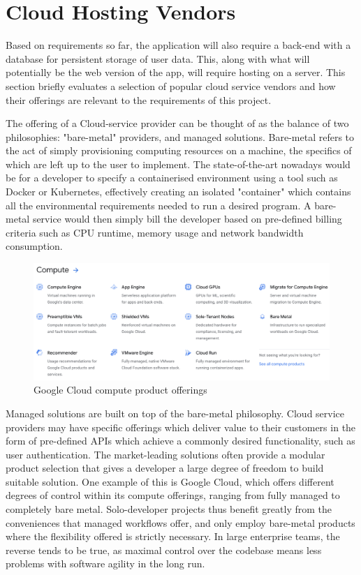 \section{Cloud Hosting Vendors}
Based on requirements so far, the application will also require a back-end with a database for persistent storage of user data. This, along with what will potentially be the web version of the app, will require hosting on a server. This section briefly evaluates a selection of popular cloud service vendors and how their offerings are relevant to the requirements of this project.

The offering of a Cloud-service provider can be thought of as the balance of two philosophies: "bare-metal" providers, and managed solutions. Bare-metal refers to the act of simply provisioning computing resources on a machine, the specifics of which are left up to the user to implement. The state-of-the-art nowadays would be for a developer to specify a containerised environment using a tool such as Docker or Kubernetes, effectively creating an isolated "container" which contains all the environmental requirements needed to run a desired program. A bare-metal service would then simply bill the developer based on pre-defined billing criteria such as CPU runtime, memory usage and network bandwidth consumption.

\begin{figure}[h]
    \begin{center}
        \includegraphics[scale=0.4]{images/google_cloud_compute_offerings.png}
    \end{center}
    \caption{Google Cloud compute product offerings}
    \label{gcp_compute_offerings}
\end{figure}

Managed solutions are built on top of the bare-metal philosophy. Cloud service providers may have specific offerings which deliver value to their customers in the form of pre-defined APIs which achieve a commonly desired functionality, such as user authentication. The market-leading solutions often provide a modular product selection that gives a developer a large degree of freedom to build suitable solution. One example of this is Google Cloud, which offers different degrees of control within its compute offerings, ranging from fully managed to completely bare metal. Solo-developer projects thus benefit greatly from the conveniences that managed workflows offer, and only employ bare-metal products where the flexibility offered is strictly necessary. In large enterprise teams, the reverse tends to be true, as maximal control over the codebase means less problems with software agility in the long run.

